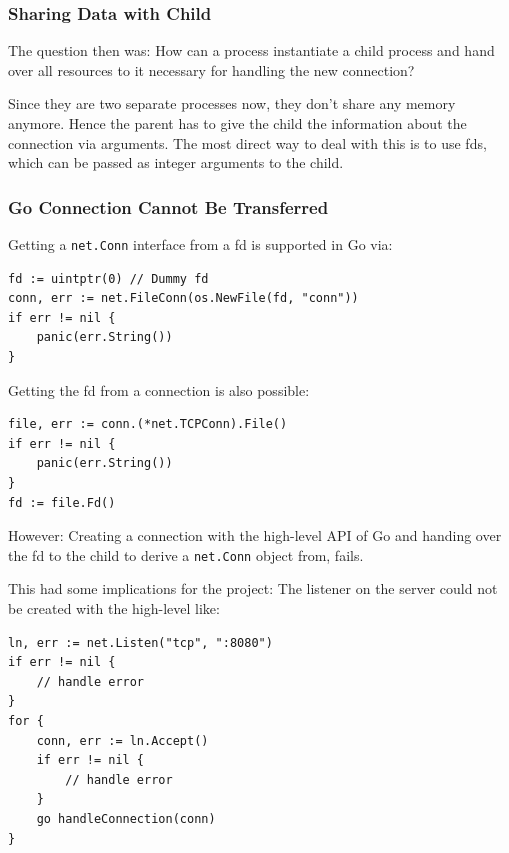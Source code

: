 \documentclass[10pt,a4paper,titlepage,twoside,english,final]{zhawreprt}
\begin{document}
\subsubsection{Sharing Data with Child}\label{sssec:SharingDataWithChild}
The question then was:
How can a process instantiate a child process and hand over all resources to it necessary for handling the new connection?

Since they are two separate processes now, they don't share any memory anymore.
Hence the parent has to give the child the information about the connection via arguments.
The most direct way to deal with this is to use \glspl{fd}, which can be passed as integer arguments to the child.

\subsubsection{Go Connection Cannot Be Transferred}\label{sssec:GoConnectionCannotBeTransferred}
Getting a \texttt{net.Conn} interface from a \gls{fd} is supported in \gls{Go} via:
\setlistingGo
\begin{lstlisting}[caption={Getting a \texttt{net.Conn} interface from a \gls{fd}},label=lst:ConnFromFD]
fd := uintptr(0) // Dummy fd
conn, err := net.FileConn(os.NewFile(fd, "conn"))
if err != nil {
	panic(err.String())
}
\end{lstlisting}

Getting the \gls{fd} from a connection is also possible:
\setlistingGo
\begin{lstlisting}[caption={Getting the \gls{fd} from a \texttt{net.Conn} object},label=lst:FDFromConn]
file, err := conn.(*net.TCPConn).File()
if err != nil {
	panic(err.String())
}
fd := file.Fd()
\end{lstlisting}

However: Creating a connection with the high-level \gls{API} of \gls{Go} and handing over the \gls{fd} to the child to derive a \texttt{net.Conn} object from, fails.

This had some implications for the project:
The listener on the server could not be created with the high-level like:
\setlistingGo
\begin{lstlisting}[caption={\gls{Go}'s high level \gls{API} for listener},label=lst:ListenForConn]
ln, err := net.Listen("tcp", ":8080")
if err != nil {
	// handle error
}
for {
	conn, err := ln.Accept()
	if err != nil {
		// handle error
	}
	go handleConnection(conn)
}
\end{lstlisting}
\end{document}
